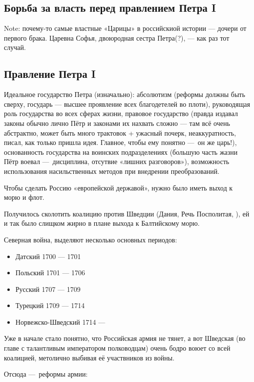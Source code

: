 \documentclass[12pt, a4paper]{article}
\begin{document}
\subsection{Борьба за власть перед правлением Петра I}

Note: почему-то самые властные «Царицы» в российскиой истории — дочери от первого брака. Царевна Софья, двоюродная сестра Петра(?), — как раз тот случай.

\subsection{Правление Петра I}

Идеальное государство Петра (изначально): абсолютизм (реформы должны быть сверху, государь — высшее проявление всех благодетелей во плоти), 
руководящая роль государства во всех сферах жизни, 
правовое государство (правда издавал законы обычно лично Пётр и законами их нахвать сложно — там всё очень абстрактно, может быть много трактовок + ужасный почерк, неаккуратность, писал, как только пришла идея. Главное, чтобы ему понятно — он же царь!),
основанность государства на воинских подразделениях (большую часть жазни Пётр воевал — дисциплина, отсутвие «лишних разговоров»), возможность использования насильственных методов при внедрении преобразований.

Чтобы сделать Россию «европейской державой», нужно было иметь выход к морю и флот.

Получилось сколотить коалицию против Шведции (Дания, Речь Посполитая, ), 
ей и так было слищком жирно в плане выхода к Балтийскому морю.

Северная война, выделяют несколько основных периодов:

\begin{itemize}
    \item Датский 1700 — 1701
    \item Польский 1701 — 1706
    \item Русский 1707 — 1709
    \item Турецкий 1709 — 1714
    \item Норвежско-Шведский 1714 — 
\end{itemize}

Уже в начале стало понятно, что Российская армия не тянет, 
а вот Шведская (во главе с талантливым императором полководцам) очень бодро воюет со всей коалицией, 
метолично выбивая её участвников из войны.

Отсюда — реформы армии:
\end{document}
